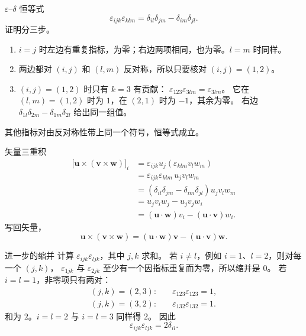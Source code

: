 \documentclass[fontset=windows, chinese, 10pt, xcolor=dvipsnames]{beamer}
\begin{document}
\begin{frame}{$\varepsilon$--$\delta$ 恒等式}
  \begin{equation*}
    \varepsilon_{ijk}\varepsilon_{klm}
    =\delta_{il}\delta_{jm}-\delta_{im}\delta_{jl}.
  \end{equation*}
  证明分三步。
  \begin{enumerate}
    \item $i=j$ 时左边有重复指标，为零；右边两项相同，也为零。$l=m$ 时同样。
    \item 两边都对 $(i,j)$ 和 $(l,m)$ 反对称，所以只要核对 $(i,j)=(1,2)$。
    \item $(i,j)=(1,2)$ 时只有 $k=3$ 有贡献：
      $\varepsilon_{123}\varepsilon_{3lm}=\varepsilon_{3lm}$。
      它在 $(l,m)=(1,2)$ 时为 $1$，在 $(2,1)$ 时为 $-1$，其余为零。
      右边 $\delta_{1l}\delta_{2m}-\delta_{1m}\delta_{2l}$ 给出同一组值。
  \end{enumerate}
  其他指标对由反对称性带上同一个符号，恒等式成立。
\end{frame}

\begin{frame}{矢量三重积}
  \begin{align*}
    \bigl[\mathbf{u}\times(\mathbf{v}\times\mathbf{w})\bigr]_i
    &= \varepsilon_{ijk}u_j(\varepsilon_{klm}v_l w_m) \\
    &= \varepsilon_{ijk}\varepsilon_{klm}\, u_j v_l w_m \\
    &= (\delta_{il}\delta_{jm}-\delta_{im}\delta_{jl})
       u_j v_l w_m \\
    &= u_j v_i w_j - u_j v_j w_i \\
    &= (\mathbf{u}\cdot\mathbf{w})v_i
     - (\mathbf{u}\cdot\mathbf{v})w_i.
  \end{align*}
  写回矢量，
  \begin{equation*}
    \mathbf{u}\times(\mathbf{v}\times\mathbf{w})
    =(\mathbf{u}\cdot\mathbf{w})\mathbf{v}
    -(\mathbf{u}\cdot\mathbf{v})\mathbf{w}.
  \end{equation*}
\end{frame}

\begin{frame}{进一步的缩并}
  计算 $\varepsilon_{ijk}\varepsilon_{ljk}$，其中 $j,k$ 求和。
  \vspace{0.3em}
  若 $i\neq l$，例如 $i=1$、$l=2$，则对每一个 $(j,k)$，
  $\varepsilon_{1jk}$ 与 $\varepsilon_{2jk}$ 至少有一个因指标重复而为零，所以缩并是 $0$。
  \vspace{0.3em}
  若 $i=l=1$，非零项只有两对：
  \begin{align*}
    (j,k)=(2,3):&\quad \varepsilon_{123}\varepsilon_{123}=1,\\
    (j,k)=(3,2):&\quad \varepsilon_{132}\varepsilon_{132}=1.
  \end{align*}
  和为 $2$。$i=l=2$ 与 $i=l=3$ 同样得 $2$。
  因此
  \begin{equation*}
    \varepsilon_{ijk}\varepsilon_{ljk}=2\delta_{il}.
  \end{equation*}
\end{frame}
\end{document}
